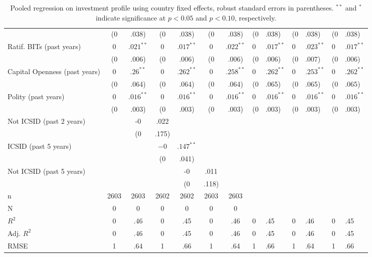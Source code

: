 \begin{table}[ht]
\begin{tabular}{lcccccc}
   & (0&.038) & (0&.038) & (0&.038) & (0&.038) & (0&.038) & (0&.038) \\ 
  Ratif. BITs (past  years) & $0$&$.021^{\ast\ast}$ & $0$&$.017^{\ast\ast}$ & $0$&$.022^{\ast\ast}$ & $0$&$.017^{\ast\ast}$ & $0$&$.023^{\ast\ast}$ & $0$&$.017^{\ast\ast}$ \\ 
   & (0&.006) & (0&.006) & (0&.006) & (0&.006) & (0&.007) & (0&.006) \\ 
  Capital Openness (past  years) & $0$&$.26^{\ast\ast}$ & $0$&$.262^{\ast\ast}$ & $0$&$.258^{\ast\ast}$ & $0$&$.262^{\ast\ast}$ & $0$&$.253^{\ast\ast}$ & $0$&$.262^{\ast\ast}$ \\ 
   & (0&.064) & (0&.064) & (0&.064) & (0&.065) & (0&.065) & (0&.065) \\ 
  Polity (past  years) & $0$&$.016^{\ast\ast}$ & $0$&$.016^{\ast\ast}$ & $0$&$.016^{\ast\ast}$ & $0$&$.016^{\ast\ast}$ & $0$&$.016^{\ast\ast}$ & $0$&$.016^{\ast\ast}$ \\ 
   & (0&.003) & (0&.003) & (0&.003) & (0&.003) & (0&.003) & (0&.003) \\ 
  Not ICSID (past 2 years) &  & -0&.022 &  &  &  &  \\ 
   &  & (0&.175) &  &  &  &  \\ 
  ICSID (past 5 years) &  &  & $-0$&$.147^{\ast\ast}$ &  &  &  \\ 
   &  &  & (0&.041) &  &  &  \\ 
  Not ICSID (past 5 years) &  &  &  & -0&.011 &  &  \\ 
   &  &  &  & (0&.118) &  &  \\ 
   \hline
n & 2603 & 2603 & 2602 & 2602 & 2603 & 2603 \\ 
  N & 0 & 0 & 0 & 0 & 0 & 0 \\ 
  $R^{2}$ & 0&.46 & 0&.45 & 0&.46 & 0&.45 & 0&.46 & 0&.45 \\ 
  Adj. $R^{2}$ & 0&.46 & 0&.45 & 0&.46 & 0&.45 & 0&.46 & 0&.45 \\ 
  RMSE & 1&.64 & 1&.66 & 1&.64 & 1&.66 & 1&.64 & 1&.66 \\ 
   \hline
\hline
\end{tabular}
\endgroup
\caption{Pooled regression on investment profile using country fixed effects, robust standard errors in parentheses. $^{**}$ and $^{*}$ indicate significance at $p< 0.05 $ and $p< 0.10 $, respectively.} 
\end{table}
